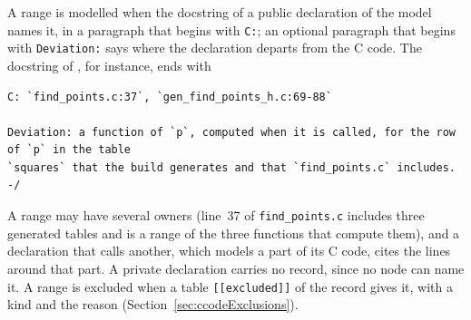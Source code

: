 A range is modelled when the docstring of a public declaration of the model names it, in a
paragraph that begins with \verb|C:|; an optional paragraph that begins with \verb|Deviation:| says
where the declaration departs from the C code. The docstring of ,
for instance, ends with
\begingroup\small
\begin{verbatim}
C: `find_points.c:37`, `gen_find_points_h.c:69-88`

Deviation: a function of `p`, computed when it is called, for the row of `p` in the table
`squares` that the build generates and that `find_points.c` includes. -/
\end{verbatim}
\endgroup
A range may have several owners (line~37 of \verb|find_points.c| includes three generated tables
and is a range of the three functions that compute them), and a declaration that calls another,
which models a part of its C code, cites the lines around that part. A private declaration carries
no record, since no node can name it. A range is excluded when a table \verb|[[excluded]]| of the
record gives it, with a kind and the reason (Section~\ref{sec:ccodeExclusions}).

